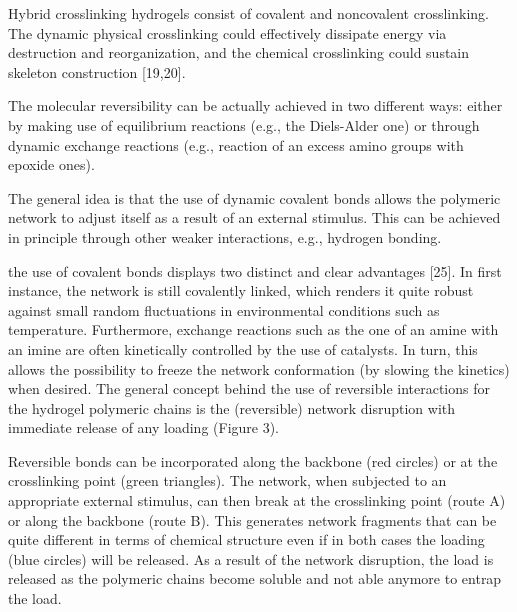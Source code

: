 Hybrid crosslinking hydrogels consist of covalent and noncovalent crosslinking\citep{xuRoleChemicalPhysical2018}. 
The dynamic physical crosslinking could effectively dissipate energy via destruction and reorganization, and the chemical crosslinking could sustain skeleton construction [19,20]\citep{xuRoleChemicalPhysical2018}. 

The molecular reversibility can be actually achieved in two different ways: either by making use of equilibrium reactions (e.g., the Diels-Alder one) or through dynamic exchange reactions (e.g., reaction of an excess amino groups with epoxide ones)\citep{picchioniHydrogelsBasedDynamic2018}.

The general idea is that the use of dynamic covalent bonds allows the polymeric network to adjust itself as a result of an external stimulus\citep{picchioniHydrogelsBasedDynamic2018}. 
This can be achieved in principle through other weaker interactions, e.g., hydrogen bonding\citep{picchioniHydrogelsBasedDynamic2018}. 

the use of covalent bonds displays two distinct and clear advantages [25]. 
In first instance, the network is still covalently linked, which renders it quite robust against small random fluctuations in environmental conditions such as temperature. 
Furthermore, exchange reactions such as the one of an amine with an imine are often kinetically controlled by the use of catalysts. 
In turn, this allows the possibility to freeze the network conformation (by slowing the kinetics) when desired\citep{picchioniHydrogelsBasedDynamic2018}. 
The general concept behind the use of reversible interactions for the hydrogel polymeric chains is the (reversible) network disruption with immediate release of any loading (Figure 3).

Reversible bonds can be incorporated along the backbone (red circles) or at the crosslinking point (green triangles). 
The network, when subjected to an appropriate external stimulus, can then break at the crosslinking point (route A) or along the backbone (route B). 
This generates network fragments that can be quite different in terms of chemical structure even if in both cases the loading (blue circles) will be released. 
As a result of the network disruption, the load is released as the polymeric chains become soluble and not able anymore to entrap the load\citep{picchioniHydrogelsBasedDynamic2018}. 



